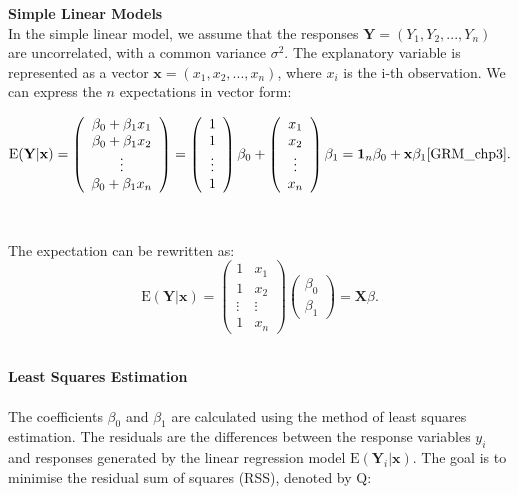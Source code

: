 \documentclass{article}\usepackage[]{graphicx}\usepackage[]{xcolor}
\begin{document}
\noindent
\textbf{Simple Linear Models}\\

\noindent
In the simple linear model, we assume that the responses $\mathbf{Y} = (Y_1, Y_2, ..., Y_n)$ are uncorrelated, with a common variance $\sigma^2$. The explanatory variable is represented as a vector $\mathbf{x} = (x_1, x_2, ..., x_n)$, where $x_i$ is the i-th observation.  We can express the $n$ expectations in vector form:

$$\mathrm{E}(\mathbf{Y} | \mathbf{x}) =
\left( \begin{array}{ccc}
\beta_0+\beta_1 x_1\\
\beta_0+\beta_1 x_2\\
\vdots\\
\beta_0+\beta_1 x_n
\end{array} \right) = 
\left( \begin{array}{ccc}
1\\
1\\
\vdots\\
1
\end{array} \right) \beta_0 + 
\left( \begin{array}{ccc}
x_1\\
x_2\\
\vdots\\
x_n
\end{array} \right) \beta_1 =
\mathbf{1}_n \beta_0 + \mathbf{x} \beta_1 \cite{GRM_chp3}.
$$ 
\\  
\\The expectation can be rewritten as: 
$$\mathrm{E}(\mathbf{Y} | \mathbf{x}) = 
\left( \begin{array}{cc}
1 & x_1\\
1  & x_2\\
\vdots& \vdots\\
1  & x_n
\end{array} \right) 
\left( \begin{array}{cc}
\beta_0 \\
\beta_1
\end{array} \right) = \mathbf{X} \beta.
$$

\\\textbf{Least Squares Estimation}\\
\\The coefficients $\beta_0$ and $\beta_1$ are calculated using the method of least squares estimation. The residuals are the differences between the response variables $y_i$ and responses generated by the linear regression model $\mathrm{E}(\mathbf{Y}_i | \mathbf{x})$. The goal is to minimise the residual sum of squares (RSS), denoted by $\mathrm{Q}$: 
\end{document}
